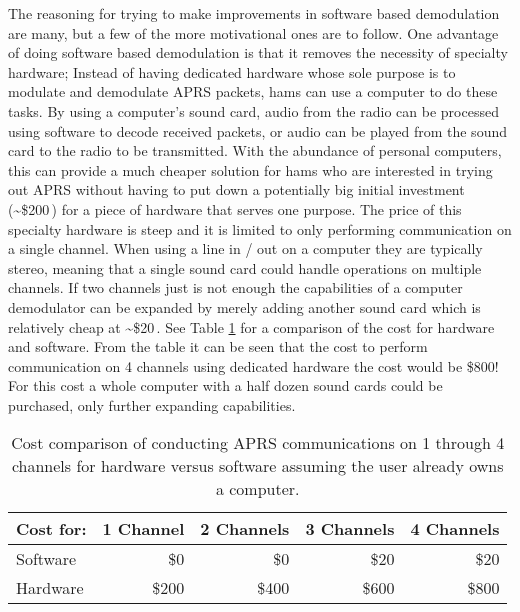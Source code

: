 The reasoning for trying to make improvements in software based demodulation are many, but a few of the more motivational ones are to follow. One advantage of doing software based demodulation is that it removes the necessity of specialty hardware; Instead of having dedicated hardware whose sole purpose is to modulate and demodulate APRS packets, hams can use a computer to do these tasks. By using a computer's sound card, audio from the radio can be processed using software to decode received packets, or audio can be played from the sound card to the radio to be transmitted. With the abundance of personal computers, this can provide a much cheaper solution for hams who are interested in trying out APRS without having to put down a potentially big initial investment (\textasciitilde\$200\,\cite{Kantronics2014,Outlet2014}) for a piece of hardware that serves one purpose. The price of this specialty hardware is steep and it is limited to only performing communication on a single channel. When using a line in / out on a computer they are typically stereo, meaning that a single sound card could handle operations on multiple channels. If two channels just is not enough the capabilities of a computer demodulator can be expanded by merely adding another sound card which is relatively cheap at \textasciitilde\$20\,\cite{Newegg}. See Table \ref{costCompareTable} for a comparison of the cost for hardware and software. From the table it can be seen that the cost to perform communication on 4 channels using dedicated hardware the cost would be \$800! For this cost a whole computer with a half dozen sound cards could be purchased, only further expanding capabilities.

\begin{table}
	\begin{center}
		\begin{tabular}{ | l | r | r | r | r | }
		\hline
			Cost for: & 1 Channel & 2 Channels & 3 Channels & 4 Channels \\ \hline
			Software & \$0 & \$0 & \$20 & \$20 \\ \hline
			Hardware & \$200 & \$400 & \$600 & \$800 \\
			\hline
		\end{tabular}
		\caption[Hardware and Software Cost Comparison]{Cost comparison of conducting APRS communications on 1 through 4 channels for hardware versus software assuming the user already owns a computer.}
		\label{costCompareTable}
	\end{center}
\end{table}

